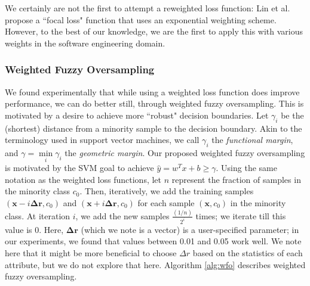\documentclass[10pt,compsoc,twocolumn]{IEEEtran}
\begin{document}
 We certainly are not the first to attempt a reweighted loss function: Lin et al.~\cite{lin2017focal} propose a ``focal loss" function that uses an exponential weighting scheme. However, to the best of our knowledge, we are the first to apply this with various weights in the software engineering domain.


\subsubsection{Weighted Fuzzy Oversampling}
\label{sec:wfo}

We found experimentally that while using a weighted loss function does improve performance, we can do better still, through weighted fuzzy oversampling. This is motivated by a desire to achieve more ``robust" decision boundaries. Let $\gamma_i$ be the (shortest) distance from a minority sample to the decision boundary. Akin to the terminology used in support vector machines, we call $\gamma_i$ the \textit{functional margin}, and $\gamma = \min\limits_i \gamma_i$ the \textit{geometric margin}. Our proposed weighted fuzzy oversampling is motivated by the SVM goal to achieve $\hat{y} = w^Tx + b \geq \gamma$. 
Using the same notation as the weighted loss functions, let $n$ represent the fraction of samples in the minority class $c_0$. Then, iteratively, we add the training samples $(\textbf{x} - i \boldsymbol{\Delta r}, c_0)$ and $(\textbf{x} + i\boldsymbol{\Delta r}, c_0)$ for each sample $(\textbf{x}, c_0)$ in the minority class. At iteration $i$, we add the new samples $\frac{(1 / n)}{2^i}$ times; we iterate till this value is 0. Here, $\boldsymbol{\Delta r}$ (which we note is a vector) is a user-specified parameter; in our experiments, we found that values between 0.01 and 0.05 work well. We note here that it might be more beneficial to choose $\Delta r$ based on the statistics of each attribute, but we do not explore that here. Algorithm \ref{alg:wfo} describes weighted fuzzy oversampling.
\end{document}
